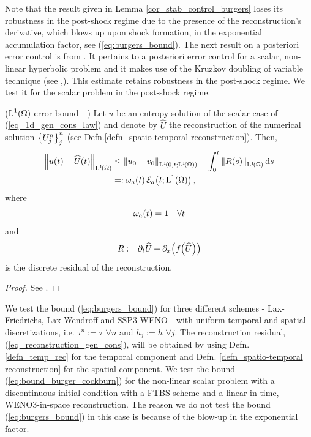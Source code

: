 \documentclass[final]{amsart}
\numberwithin{equation}{section}
\begin{document}
\begin{Rem} Note that the  result given in Lemma  \ref{cor_stab_control_burgers} loses its robustness in the post-shock regime due to the presence of the reconstruction's derivative, which blows up upon shock formation, in the exponential accumulation factor, see (\ref{eq:burgers_bound}).   The next result on a posteriori error control is from \cite{cockburn1995posteriori}.  It pertains to a posteriori error control for a scalar, non-linear hyperbolic problem and it makes use of the Kruzkov doubling of variable technique (see \cite{kruvzkov1970first},\cite{kuznetsov1976accuracy}).  This estimate retains robustness in the post-shock regime.  We test it for the scalar problem in the post-shock regime.  
\end{Rem} 

\begin{The}($\operatorname L^{1}\!\left({\Omega}\right)$ error bound - \cite[Thm. 2.1]{cockburn1995posteriori})\label{thm:bound_post_shock_burgers} Let $u$ be an entropy solution of the scalar case of (\ref{eq_1d_gen_cons_law}) and denote by $\widehat{U}$ the reconstruction of the numerical solution $\left\lbrace U^n_j\right\rbrace^n_j$ (see Defn.\ref{defn_spatio-temporal reconstruction}).  Then,
	\begin{equation}\label{eq:bound_burger_cockburn}
	\begin{aligned}
	\Norm{u\qp{t} - \widehat{U}\qp{t}}_{\leb{1}\qp{\W}}
	&\leq 
	\Norm{u_0-v_0}_{\leb{1}\qp{0,t;\leb{1}\qp{\W}}}
	+
	\int_{0}^t\Norm{R\qp{s}}_{\leb{1}\qp{\W}}\mathrm{d}s\\
	&=:
	\w_a\qp{t}\mathcal{E}_a\qp{t;\leb{1}\qp{\W}},
	\end{aligned}
	\end{equation}
	where
	\begin{equation*}
	\omega_a\!\left({t}\right)=1\quad \forall t
	\end{equation*}
	and
	\begin{equation*}
	R:=  \partial_t\widehat{ U}+\partial_x \!\left({{f}\!\left({\widehat{U}}\right)}\right)
	\end{equation*}
	is the discrete residual of the reconstruction.
\end{The}
\begin{proof} See \cite[Appendix]{cockburn1995posteriori}.
\end{proof}

We test the bound (\ref{eq:burgers_bound}) for three different schemes
- Lax-Friedrichs, Lax-Wendroff and SSP3-WENO - with uniform temporal
and spatial discretizations, i.e. $\tau^n:=\tau $ $\forall n$ and
$h_j:=h$ $\forall j$.  The reconstruction residual,
(\ref{eq_reconstruction_gen_cons}), will be obtained by using
Defn. \ref{defn_temp_rec} for the temporal component and
Defn. \ref{defn_spatio-temporal reconstruction} for the spatial
component.
We test the bound (\ref{eq:bound_burger_cockburn}) for the non-linear scalar problem with a discontinuous initial condition with a FTBS scheme and a linear-in-time, WENO3-in-space reconstruction.  The reason we do not test the bound (\ref{eq:burgers_bound}) in this case is because of the blow-up in the exponential factor.
\end{document}
